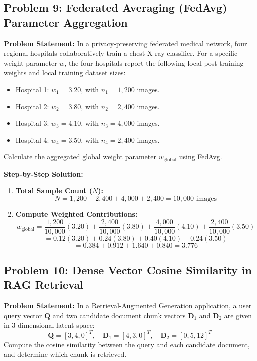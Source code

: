 \subsection*{Problem 9: Federated Averaging (FedAvg) Parameter Aggregation}
\textbf{Problem Statement:} In a privacy-preserving federated medical network, four regional hospitals collaboratively train a chest X-ray classifier. For a specific weight parameter $w$, the four hospitals report the following local post-training weights and local training dataset sizes:
\begin{itemize}
    \item Hospital 1: $w_1 = 3.20$, with $n_1 = 1,200$ images.
    \item Hospital 2: $w_2 = 3.80$, with $n_2 = 2,400$ images.
    \item Hospital 3: $w_3 = 4.10$, with $n_3 = 4,000$ images.
    \item Hospital 4: $w_4 = 3.50$, with $n_4 = 2,400$ images.
\end{itemize}
Calculate the aggregated global weight parameter $w_{\text{global}}$ using FedAvg.

\textbf{Step-by-Step Solution:}
\begin{enumerate}[label=\arabic*.]
    \item \textbf{Total Sample Count ($N$):}
    \[
    N = 1,200 + 2,400 + 4,000 + 2,400 = 10,000 \text{ images}
    \]
    \item \textbf{Compute Weighted Contributions:}
    \[
    w_{\text{global}} = \frac{1,200}{10,000}(3.20) + \frac{2,400}{10,000}(3.80) + \frac{4,000}{10,000}(4.10) + \frac{2,400}{10,000}(3.50)
    \]
    \[
    = 0.12(3.20) + 0.24(3.80) + 0.40(4.10) + 0.24(3.50)
    \]
    \[
    = 0.384 + 0.912 + 1.640 + 0.840 = \mathbf{3.776}
    \]
\end{enumerate}

\subsection*{Problem 10: Dense Vector Cosine Similarity in RAG Retrieval}
\textbf{Problem Statement:} In a Retrieval-Augmented Generation application, a user query vector $\mathbf{Q}$ and two candidate document chunk vectors $\mathbf{D}_1$ and $\mathbf{D}_2$ are given in 3-dimensional latent space:
\[
\mathbf{Q} = [3, 4, 0]^T, \quad \mathbf{D}_1 = [4, 3, 0]^T, \quad \mathbf{D}_2 = [0, 5, 12]^T
\]
Compute the cosine similarity between the query and each candidate document, and determine which chunk is retrieved.

